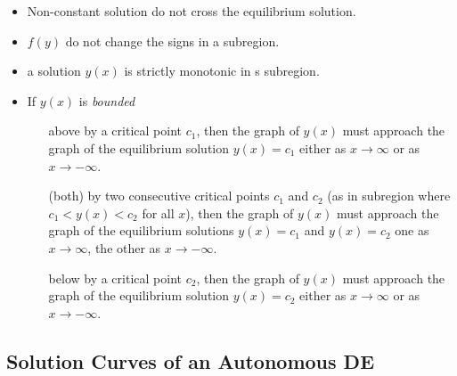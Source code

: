 \documentclass{beaulivre}
\begin{document}
\begin{itemize}
    \item Non-constant solution do not cross the equilibrium solution.
    \item $f(y)$ do not change the signs in a subregion.
    \item a solution $y(x)$ is strictly monotonic in s subregion.
    \item If $y(x)$ is \emph{bounded}
        \begin{itemize}
            \item[above] by a critical point $c_1$,
                then the graph of $y(x)$ must approach the graph of the
                equilibrium solution $y(x) = c_1$ 
                either as $x \to \infty$ or as $x \to - \infty$.
            \item[(both)] by two consecutive critical points 
                $c_1$ and $c_2$ (as in subregion where $c_1 < y(x) < c_2$ for all $x$),
                then the graph of $y(x)$ must approach the graph of the
                equilibrium solutions $y(x) = c_1$ and $y(x) = c_2$
                one as $x \to \infty$, the other as $x \to - \infty$.
            \item[below] by a critical point $c_2$,
                then the graph of $y(x)$ must approach the graph of the
                equilibrium solution $y(x) = c_2$ 
                either as $x \to \infty$ or as $x \to - \infty$.
        \end{itemize}
\end{itemize}

\subsection{Solution Curves of an Autonomous DE}
\end{document}
